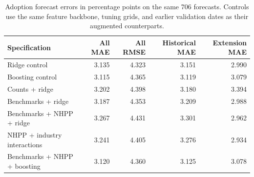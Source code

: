 \begin{table}[H]
\centering
\small
\caption{Adoption forecast errors in percentage points on the same 706 forecasts. Controls use the same feature backbone, tuning grids, and earlier validation dates as their augmented counterparts.}\label{tab:release-adoption}
\begin{tabular}{lrrrr}
\toprule
Specification & All MAE & All RMSE & Historical MAE & Extension MAE \\
\midrule
Ridge control & 3.135 & 4.323 & 3.151 & 2.990 \\
Boosting control & 3.115 & 4.365 & 3.119 & 3.079 \\
Counts + ridge & 3.202 & 4.398 & 3.180 & 3.394 \\
Benchmarks + ridge & 3.187 & 4.353 & 3.209 & 2.988 \\
Benchmarks + NHPP + ridge & 3.267 & 4.431 & 3.301 & 2.962 \\
NHPP + industry interactions & 3.241 & 4.405 & 3.276 & 2.934 \\
Benchmarks + NHPP + boosting & 3.120 & 4.360 & 3.125 & 3.078 \\
\bottomrule
\end{tabular}
\end{table}
